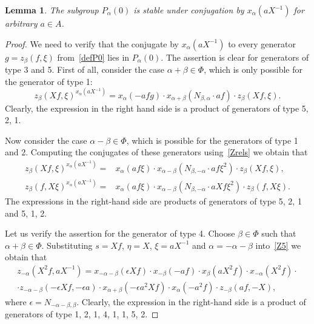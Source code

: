 \documentclass[oneside, 8pt]{amsart}
\newtheorem{lemma}{Lemma}
\theoremstyle{remark}
\theoremstyle{definition}
\numberwithin{lemma}{section}
\numberwithin{prop}{section}
\numberwithin{corollary}{section}
\numberwithin{equation}{section}
\begin{document}
\begin{lemma}\label{P0_conj} The subgroup $P_\alpha(0)$ is stable under conjugation by $x_\alpha(aX^{-1})$ for arbitrary $a\in A$. \end{lemma}
\begin{proof} We need to verify that the conjugate by $x_\alpha(aX^{-1})$ to every generator $g = z_\beta(f, \xi)$ from~\cref{defP0} lies in $P_\alpha(0)$. 
The assertion is clear for generators of type 3 and 5.
First of all, consider the case $\alpha + \beta \in \Phi$, which is only possible for the generator of type 1:
\begin{equation}\label{eq:Zconj1} z_{\beta}(Xf, \xi) ^ {x_{\alpha}(aX^{-1})} = x_{\alpha} (- afg) \cdot x_{\alpha+\beta} (N_{\beta, \alpha}\cdot af) \cdot z_{\beta}(Xf, \xi). \end{equation}
Clearly, the expression in the right hand side is a product of generators of type 5, 2, 1. 

Now consider the case $\alpha - \beta \in \Phi$, which is possible for the generators of type 1 and 2.
Computing the conjugates of these generators using~\cref{Zrels} we obtain that
\begin{align} z_{\beta}(Xf, \xi) ^ {x_{\alpha}(aX^{-1})} = &  x_{\alpha} (af\xi) \cdot x_{\alpha-\beta} (N_{\beta,-\alpha}\cdot af\xi^2) \cdot z_{\beta}(Xf, \xi), \label{eq:Zconj2} \\
z_{\beta}(f, X\xi) ^ {x_{\alpha}(aX^{-1})} = & x_{\alpha} (af\xi) \cdot x_{\alpha-\beta} (N_{\beta,-\alpha}\cdot aXf\xi^2) \cdot z_{\beta}(f, X\xi). \nonumber \end{align}
The expressions in the right-hand side are products of generators of type 5, 2, 1 and 5, 1, 2.

Let us verify the assertion for the generator of type 4.
Choose $\beta\in \Phi$ such that $\alpha+\beta \in \Phi$. 
Substituting $s = Xf$, $\eta = X$, $\xi = aX^{-1}$ and $\alpha = -\alpha - \beta$ into~\eqref{Z5} we obtain that
\begin{multline} \label{eq:Zconj3} z_{-\alpha}(X^2f, aX^{-1}) = x_{-\alpha-\beta}(\epsilon Xf) \cdot x_{-\beta}(-af) \cdot x_{\beta}(aX^2 f) \cdot x_{-\alpha}(X^2f) \cdot \\
 \cdot z_{-\alpha-\beta}(-\epsilon Xf, -\epsilon a) \cdot x_{\alpha+\beta}(-\epsilon a^2 Xf) \cdot x_{\alpha}(- a^2 f) \cdot z_{-\beta}(a f, -X), \end{multline}
where $\epsilon = N_{-\alpha-\beta,\beta}$. 
Clearly, the expression in the right-hand side is a product of generators of type 1, 2, 1, 4, 1, 1, 5, 2. \end{proof}
\end{document}
